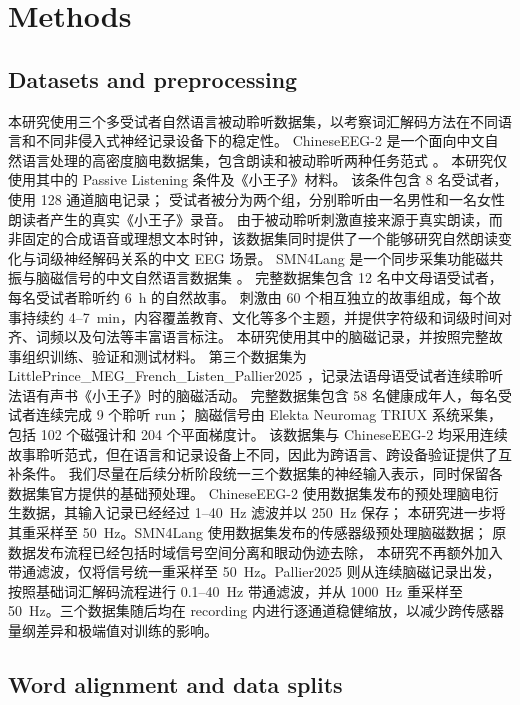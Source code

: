 
\section{Methods}

\subsection{Datasets and preprocessing} 
本研究使用三个多受试者自然语言被动聆听数据集，以考察词汇解码方法在不同语言和不同非侵入式神经记录设备下的稳定性。 
ChineseEEG-2 是一个面向中文自然语言处理的高密度脑电数据集，包含朗读和被动聆听两种任务范式 \cite{chen2026chineseeeg2}。
本研究仅使用其中的 Passive Listening 条件及《小王子》材料。
该条件包含 8 名受试者，使用 128 通道脑电记录；
受试者被分为两个组，分别聆听由一名男性和一名女性朗读者产生的真实《小王子》录音。
由于被动聆听刺激直接来源于真实朗读，而非固定的合成语音或理想文本时钟，该数据集同时提供了一个能够研究自然朗读变化与词级神经解码关系的中文 EEG 场景。 
SMN4Lang 是一个同步采集功能磁共振与脑磁信号的中文自然语言数据集 \cite{wang2022smn4lang}。
完整数据集包含 12 名中文母语受试者，每名受试者聆听约 6~h 的自然故事。
刺激由 60 个相互独立的故事组成，每个故事持续约 4--7~min，内容覆盖教育、文化等多个主题，并提供字符级和词级时间对齐、词频以及句法等丰富语言标注。
本研究使用其中的脑磁记录，并按照完整故事组织训练、验证和测试材料。 
第三个数据集为 LittlePrince\_MEG\_French\_Listen\_Pallier2025 \cite{bel2026littleprincemeg}，记录法语母语受试者连续聆听法语有声书《小王子》时的脑磁活动。
完整数据集包含 58 名健康成年人，每名受试者连续完成 9 个聆听 run；
脑磁信号由 Elekta Neuromag TRIUX 系统采集，包括 102 个磁强计和 204 个平面梯度计。
该数据集与 ChineseEEG-2 均采用连续故事聆听范式，但在语言和记录设备上不同，因此为跨语言、跨设备验证提供了互补条件。 
我们尽量在后续分析阶段统一三个数据集的神经输入表示，同时保留各数据集官方提供的基础预处理。
ChineseEEG-2 使用数据集发布的预处理脑电衍生数据，其输入记录已经经过 1--40~Hz 滤波并以 250~Hz 保存；
本研究进一步将其重采样至 50~Hz。SMN4Lang 使用数据集发布的传感器级预处理脑磁数据；
原数据发布流程已经包括时域信号空间分离和眼动伪迹去除，
本研究不再额外加入带通滤波，仅将信号统一重采样至 50~Hz。Pallier2025 则从连续脑磁记录出发，按照基础词汇解码流程进行 0.1--40~Hz 带通滤波，并从 1000~Hz 重采样至 50~Hz。三个数据集随后均在 recording 内进行逐通道稳健缩放，以减少跨传感器量纲差异和极端值对训练的影响。

\subsection{Word alignment and data splits}

